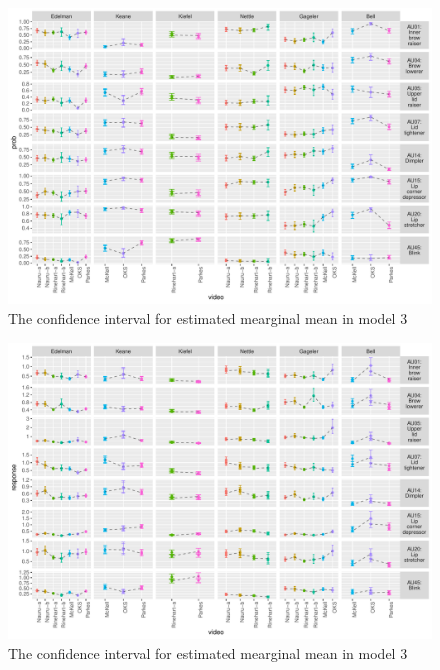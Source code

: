 \documentclass{monashthesis}
\begin{document}
\begin{figure}

{\centering \includegraphics[width=1\linewidth]{figures/model3-plot-1} 

}

\caption{The confidence interval for estimated mearginal mean in model 3}\label{fig:model3-plot}
\end{figure}

\begin{figure}

{\centering \includegraphics[width=1\linewidth]{figures/intensity-speaker-1} 

}

\caption{The confidence interval for estimated mearginal mean in model 3}\label{fig:intensity-speaker}
\end{figure}

\printbibliography[heading=bibintoc]
\end{document}
